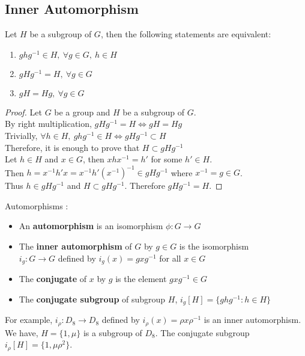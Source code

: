 \subsection{Inner Automorphism}
\begin{theorem}
	Let $H$ be a subgroup of $G$, then the following statements are equivalent:
	\begin{enumerate}
		\item $ghg^{-1} \in H,\ \forall g \in G,\ h \in H$
		\item $gHg^{-1} = H,\ \forall g \in G$
		\item $gH = Hg,\ \forall g \in G$
	\end{enumerate}
\end{theorem}
\begin{proof}
	Let $G$ be a group and $H$ be a subgroup of $G$.\\
	By right multiplication,  $gHg^{-1} = H \iff gH = Hg$\\
	Trivially, $\forall h \in H,\ ghg^{-1} \in H \iff gHg^{-1} \subset H$\\
	Therefore, it is enough to prove that $H \subset gHg^{-1}$\\
	Let $h \in H$ and $x \in G$, then $xhx^{-1} = h'$ for some $h' \in H$.\\
	Then $h = x^{-1}h'x = x^{-1}h'(x^{-1})^{-1} \in gHg^{-1}$ where $x^{-1} = g \in G$.\\
	Thus $h \in gHg^{-1}$ and $H \subset gHg^{-1}$. Therefore $gHg^{-1} = H$.
\end{proof}

\begin{definition}Automorphisms : 
	\begin{itemize}
		\item An \textbf{automorphism} is an isomorphism $\phi : G \to G$
		\item The \textbf{inner automorphism} of $G$ by $g \in G$ is the isomorphism\\
			$i_g : G \to G$ defined by $i_g(x) = gxg^{-1}$ for all $x \in G$
		\item The \textbf{conjugate} of $x$ by $g$ is the element $gxg^{-1} \in G$
		\item The \textbf{conjugate subgroup} of subgroup $H$, $i_g[H] = \{ ghg^{-1} : h \in H \}$
	\end{itemize}
\end{definition}

\begin{remark}
	For example, $i_\rho : D_8 \to D_8$ defined by $i_\rho(x) = \rho x \rho^{-1}$ is an inner automorphism.
	We have, $H = \{ 1,\mu \}$ is a subgroup of $D_8$.
	The conjugate subgroup $i_\rho[H] = \{ 1,\mu\rho^2 \}$.
\end{remark}

